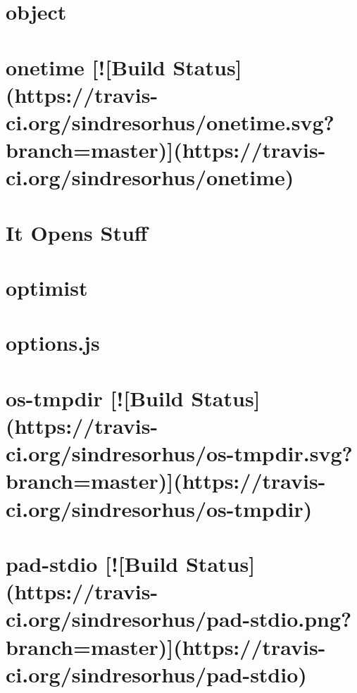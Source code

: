 \documentclass[twoside]{book}
\newcommand{\+}{\discretionary{\mbox{\scriptsize$\hookleftarrow$}}{}{}}
\begin{document}
\chapter{object}
\label{md_app_web_node_modules_object-component__readme}

\chapter{onetime \mbox{[}!\mbox{[}Build Status\mbox{]}(https\+://travis-\/ci.org/sindresorhus/onetime.svg?branch=master)\mbox{]}(https\+://travis-\/ci.org/sindresorhus/onetime)}
\label{md_app_web_node_modules_onetime_readme}

\chapter{It Opens Stuff}
\label{md_app_web_node_modules_opener__r_e_a_d_m_e}

\chapter{optimist}
\label{md_app_web_node_modules_optimist_readme}

\chapter{options.\+js}
\label{md_app_web_node_modules_options__r_e_a_d_m_e}

\chapter{os-\/tmpdir \mbox{[}!\mbox{[}Build Status\mbox{]}(https\+://travis-\/ci.org/sindresorhus/os-\/tmpdir.svg?branch=master)\mbox{]}(https\+://travis-\/ci.org/sindresorhus/os-\/tmpdir)}
\label{md_app_web_node_modules_os-tmpdir_readme}

\chapter{pad-\/stdio \mbox{[}!\mbox{[}Build Status\mbox{]}(https\+://travis-\/ci.org/sindresorhus/pad-\/stdio.png?branch=master)\mbox{]}(https\+://travis-\/ci.org/sindresorhus/pad-\/stdio)}
\label{md_app_web_node_modules_pad-stdio_readme}

\end{document}
